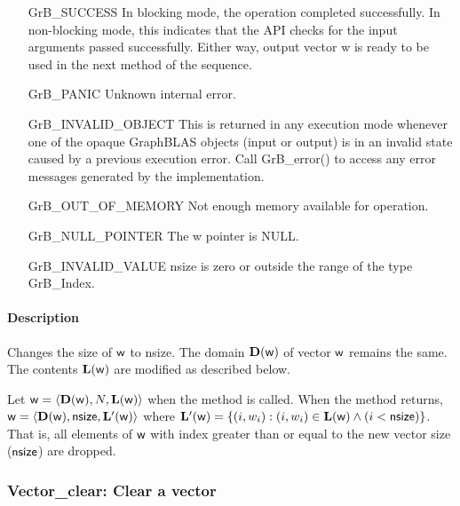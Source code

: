 \begin{itemize}[leftmargin=2.1in]
    \item[{\sf GrB\_SUCCESS}]         In blocking mode, the operation completed
    successfully. In non-blocking mode, this indicates that the API checks 
    for the input arguments passed successfully. Either way, output vector 
    {\sf w} is ready to be used in the next method of the sequence.

    \item[{\sf GrB\_PANIC}]           Unknown internal error.
    
    \item[{\sf GrB\_INVALID\_OBJECT}] This is returned in any execution mode 
    whenever one of the opaque GraphBLAS objects (input or output) is in an invalid 
    state caused by a previous execution error.  Call {\sf GrB\_error()} to access 
    any error messages generated by the implementation.

    \item[{\sf GrB\_OUT\_OF\_MEMORY}] Not enough memory available for operation.
    
    \item[{\sf GrB\_NULL\_POINTER}]  The {\sf w} pointer is {\sf NULL}.
    
    \item[{\sf GrB\_INVALID\_VALUE}] {\sf nsize} is zero or outside the range of the type {\sf GrB\_Index}.
\end{itemize}

\paragraph{Description}

Changes the size of ${\sf w}$ to {\sf nsize}. The domain
$\mathbf{D}({\sf w})$ of vector ${\sf w}$ remains the same. The
contents $\mathbf{L}({\sf w})$ are modified as described below.

Let ${\sf w} = \langle \mathbf{D}({\sf w}), N, \mathbf{L}({\sf w})
\rangle$ when the method is called. When the method returns, ${\sf w}
= \langle \mathbf{D}({\sf w}), {\sf nsize}, \mathbf{L'}({\sf w})
\rangle$ where $\mathbf{L'}({\sf w}) = \{(i,w_i) : (i,w_i) \in
\mathbf{L}({\sf w}) \wedge (i < {\sf nsize})\}$. That is, all elements
of ${\sf w}$ with index greater than or equal to the new vector size
(${\sf nsize}$) are dropped.

\subsubsection{{\sf Vector\_clear}: Clear a vector}

